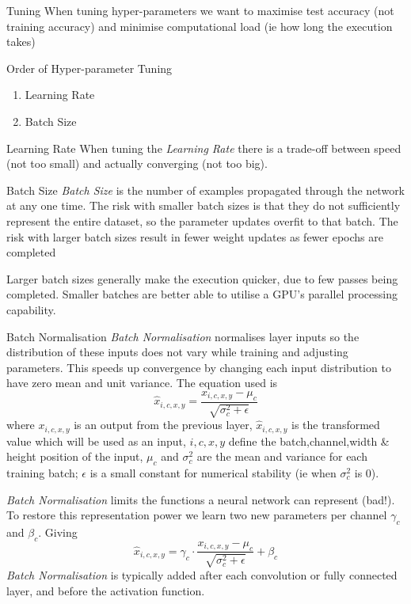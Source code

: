 \documentclass[11pt,a4paper]{article}
\begin{document}
\begin{remark}{Tuning}
  When tuning hyper-parameters we want to maximise test accuracy (not training accuracy) and minimise computational load (ie how long the execution takes)
\end{remark}

\begin{proposition}{Order of Hyper-parameter Tuning}
  \begin{enumerate}
    \item Learning Rate
    \item Batch Size
  \end{enumerate}
\end{proposition}

\begin{remark}{Learning Rate}
  When tuning the \textit{Learning Rate} there is a trade-off between speed (not too small) and actually converging (not too big).
\end{remark}

\begin{remark}{Batch Size}
  \textit{Batch Size} is the number of examples propagated through the network at any one time. The risk with smaller batch sizes is that they do not sufficiently represent the entire dataset, so the parameter updates overfit to that batch. The risk with larger batch sizes result in fewer weight updates as fewer epochs are completed
  \par Larger batch sizes generally make the execution quicker, due to few passes being completed. Smaller batches are better able to utilise a GPU's parallel processing capability.
\end{remark}

\begin{definition}{Batch Normalisation}
  \textit{Batch Normalisation} normalises layer inputs so the distribution of these inputs does not vary while training and adjusting parameters. This speeds up convergence by changing each input distribution to have zero mean and unit variance. The equation used is
  \[ \hat{x}_{i,c,x,y}=\frac{x_{i,c,x,y}-\mu_c}{\sqrt{\sigma^2_c+\epsilon}} \]
  where $x_{i,c,x,y}$ is an output from the previous layer, $\hat{x}_{i,c,x,y}$ is the transformed value which will be used as an input, $i,c,x,y$ define the batch,channel,width \& height position of the input, $\mu_c$ and $\sigma^2_c$ are the mean and variance for each training batch; $\epsilon$ is a small constant for numerical stability (ie when $\sigma^2_c$ is 0).
  \par \textit{Batch Normalisation} limits the functions a neural network can represent (bad!). To restore this representation power we learn two new parameters per channel $\gamma_c$ and $\beta_c$. Giving
  \[ \hat{x}_{i,c,x,y}=\gamma_c\cdot\frac{x_{i,c,x,y}-\mu_c}{\sqrt{\sigma^2_c+\epsilon}}+\beta_c \]
  \textit{Batch Normalisation} is typically added after each convolution or fully connected layer, and before the activation function.
\end{definition}
\end{document}
